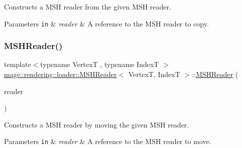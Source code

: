 Constructs a M\+SH reader from the given M\+SH reader.


\begin{DoxyParams}[1]{Parameters}
\mbox{\tt in}  & {\em reader} & A reference to the M\+SH reader to copy. \\
\hline
\end{DoxyParams}
\mbox{\label{classmage_1_1rendering_1_1loader_1_1_m_s_h_reader_a107ac854c231c1a1c39f30c5199dcec7}} 
\subsubsection{\texorpdfstring{M\+S\+H\+Reader()}{MSHReader()}\hspace{0.1cm}{\footnotesize\ttfamily [3/3]}}
{\footnotesize\ttfamily template$<$typename VertexT , typename IndexT $>$ \\
\mbox{\hyperlink{classmage_1_1rendering_1_1loader_1_1_m_s_h_reader}{mage\+::rendering\+::loader\+::\+M\+S\+H\+Reader}}$<$ VertexT, IndexT $>$\+::\mbox{\hyperlink{classmage_1_1rendering_1_1loader_1_1_m_s_h_reader}{M\+S\+H\+Reader}} (\begin{DoxyParamCaption}\item[{\mbox{\hyperlink{classmage_1_1rendering_1_1loader_1_1_m_s_h_reader}{M\+S\+H\+Reader}}$<$ VertexT, IndexT $>$ \&\&}]{reader }\end{DoxyParamCaption})\hspace{0.3cm}{\ttfamily [noexcept]}}

Constructs a M\+SH reader by moving the given M\+SH reader.


\begin{DoxyParams}[1]{Parameters}
\mbox{\tt in}  & {\em reader} & A reference to the M\+SH reader to move. \\
\hline
\end{DoxyParams}
\mbox{\label{classmage_1_1rendering_1_1loader_1_1_m_s_h_reader_af45daf383d4e94586b5d2968d5357fce}} 
